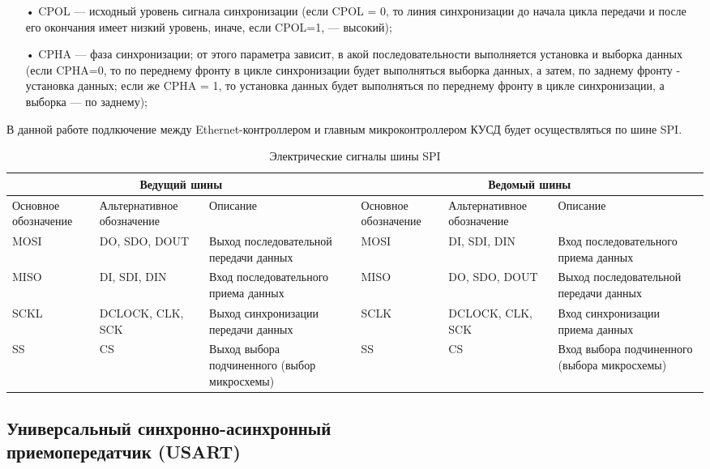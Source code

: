 \begin{itemize}
	\item[•] CPOL --- исходный уровень сигнала синхронизации (если CPOL = 0, то линия синхронизации до начала цикла передачи и после его окончания имеет низкий уровень, иначе, если CPOL=1, --- высокий);
	\item[•] CPHA --- фаза синхронизации; от этого параметра зависит, в акой последовательности выполняется установка и выборка данных (если CPHA=0, то по переднему фронту в цикле синхронизации будет выполняться выборка данных, а затем, по заднему фронту - установка данных; если же CPHA = 1, то установка данных будет выполняться по переднему фронту в цикле синхронизации, а выборка --- по заднему);
\end{itemize}

В данной работе подлкючение между Ethernet-контроллером и главным микроконтроллером КУСД будет осуществляться по шине SPI.

\begin{table}[h!]
\caption{Электрические сигналы шины SPI}
\label{spitabl}
	\begin{tabular}{|p{20mm}|p{20mm}|p{28mm}|p{20mm}|p{20mm}|p{28mm}|}
	\hline
	\multicolumn{3}{|c|}{Ведущий шины} & \multicolumn{3}{|c|}{Ведомый шины} \\
	\hline
		\small{Основное обозначение} & \small{Альте\-рна\-ти\-вное обозначение} & \small{Описание}& \small{Основное обозначение} & \small{Альте\-рна\-ти\-вное обозначение} & \small{Описание}\\
	\hline
		MOSI & DO, SDO, DOUT & Выход последовательной передачи данных & MOSI & DI, SDI, DIN & Вход последовательного приема данных \\
	\hline
		MISO & DI, SDI, DIN & Вход последовательного приема данных & MISO & DO, SDO, DOUT & Выход последовательной передачи данных \\
	\hline
		SCKL & DCLOCK, CLK, SCK & Выход синхронизации передачи данных & SCLK & DCLOCK, CLK, SCK & Вход синхронизации приема данных\\
	\hline
		SS & CS & Выход выбора подчиненного (выбор микросхемы) & SS & CS & Вход выбора подчиненного (выбора микросхемы)\\
	\hline
	\end{tabular}
\end{table}


\subsection{Универсальный синхронно-асинхронный\\ приемопередатчик (USART)}

